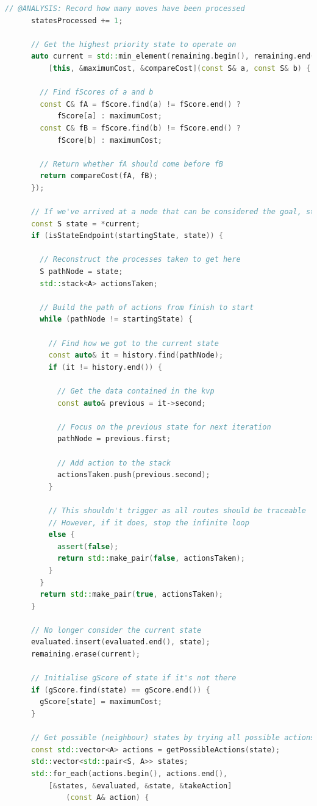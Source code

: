\documentclass[11pt, a4paper]{report}
\begin{document}
\begin{appendices}
\begin{lstlisting}[language=C++]
      // @ANALYSIS: Record how many moves have been processed
      statesProcessed += 1;

      // Get the highest priority state to operate on
      auto current = std::min_element(remaining.begin(), remaining.end(),
          [this, &maximumCost, &compareCost](const S& a, const S& b) {

        // Find fScores of a and b
        const C& fA = fScore.find(a) != fScore.end() ?
            fScore[a] : maximumCost;
        const C& fB = fScore.find(b) != fScore.end() ?
            fScore[b] : maximumCost;

        // Return whether fA should come before fB
        return compareCost(fA, fB);
      });

      // If we've arrived at a node that can be considered the goal, stop
      const S state = *current;
      if (isStateEndpoint(startingState, state)) {

        // Reconstruct the processes taken to get here
        S pathNode = state;
        std::stack<A> actionsTaken;

        // Build the path of actions from finish to start
        while (pathNode != startingState) {

          // Find how we got to the current state
          const auto& it = history.find(pathNode);
          if (it != history.end()) {

            // Get the data contained in the kvp
            const auto& previous = it->second;

            // Focus on the previous state for next iteration
            pathNode = previous.first;

            // Add action to the stack
            actionsTaken.push(previous.second);
          }

          // This shouldn't trigger as all routes should be traceable
          // However, if it does, stop the infinite loop
          else {
            assert(false);
            return std::make_pair(false, actionsTaken);
          }
        }
        return std::make_pair(true, actionsTaken);
      }

      // No longer consider the current state
      evaluated.insert(evaluated.end(), state);
      remaining.erase(current);

      // Initialise gScore of state if it's not there
      if (gScore.find(state) == gScore.end()) {
        gScore[state] = maximumCost;
      }
      
      // Get possible (neighbour) states by trying all possible actions
      const std::vector<A> actions = getPossibleActions(state);
      std::vector<std::pair<S, A>> states;
      std::for_each(actions.begin(), actions.end(),
          [&states, &evaluated, &state, &takeAction] 
              (const A& action) {


\end{lstlisting}
\end{appendices}
\end{document}
